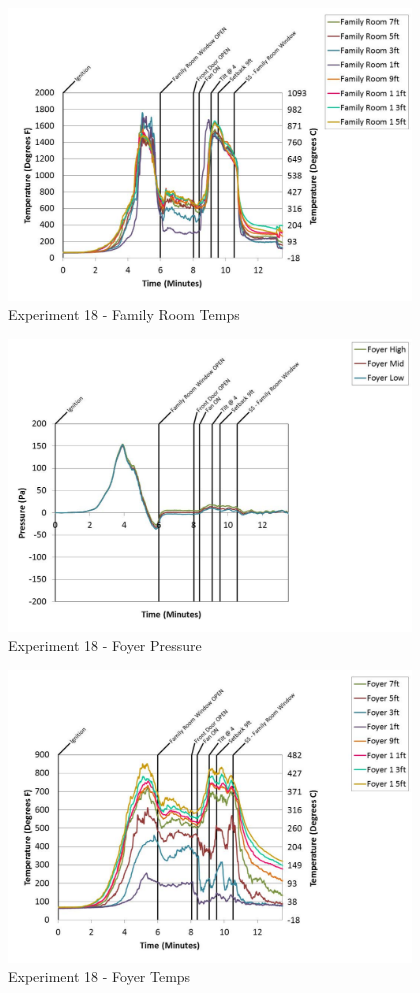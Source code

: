 \documentclass{article}
\begin{document}
\begin{appendices}
	\clearpage

	\begin{figure}[h!]
		\centering
		\includegraphics[height=3.05in]{0_Images/Results_Charts/Exp_18_Charts/FamilyRoomTemps.pdf}
		\caption{Experiment 18 - Family Room Temps}
	\end{figure}
 

	\begin{figure}[h!]
		\centering
		\includegraphics[height=3.05in]{0_Images/Results_Charts/Exp_18_Charts/FoyerPressure.pdf}
		\caption{Experiment 18 - Foyer Pressure}
	\end{figure}
 
	\clearpage

	\begin{figure}[h!]
		\centering
		\includegraphics[height=3.05in]{0_Images/Results_Charts/Exp_18_Charts/FoyerTemps.pdf}
		\caption{Experiment 18 - Foyer Temps}
	\end{figure}
 


\end{appendices}
\end{document}
